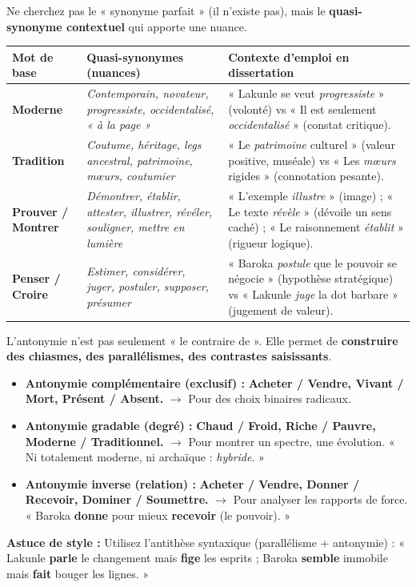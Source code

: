 \documentclass[11pt]{article}
\begin{document}
\begin{propriete}
Ne cherchez pas le « synonyme parfait » (il n'existe pas), mais le \textbf{quasi-synonyme contextuel} qui apporte une nuance.
\begin{center}
\begin{tabularx}{\linewidth}{|l|X|X|}
\hline
\rowcolor{popblueL}
\textbf{Mot de base} & \textbf{Quasi-synonymes (nuances)} & \textbf{Contexte d'emploi en dissertation} \\
\hline
\textbf{Moderne} & \emph{Contemporain, novateur, progressiste, occidentalisé, « à la page »} & « Lakunle se veut \emph{progressiste} » (volonté) vs « Il est seulement \emph{occidentalisé} » (constat critique). \\
\hline
\textbf{Tradition} & \emph{Coutume, héritage, legs ancestral, patrimoine, mœurs, coutumier} & « Le \emph{patrimoine} culturel » (valeur positive, muséale) vs « Les \emph{mœurs} rigides » (connotation pesante). \\
\hline
\textbf{Prouver / Montrer} & \emph{Démontrer, établir, attester, illustrer, révéler, souligner, mettre en lumière} & « L'exemple \emph{illustre} » (image) ; « Le texte \emph{révèle} » (dévoile un sens caché) ; « Le raisonnement \emph{établit} » (rigueur logique). \\
\hline
\textbf{Penser / Croire} & \emph{Estimer, considérer, juger, postuler, supposer, présumer} & « Baroka \emph{postule} que le pouvoir se négocie » (hypothèse stratégique) vs « Lakunle \emph{juge} la dot barbare » (jugement de valeur). \\
\hline
\end{tabularx}
\end{center}
\end{propriete}

\begin{propriete}
L'antonymie n'est pas seulement « le contraire de ». Elle permet de \textbf{construire des chiasmes, des parallélismes, des contrastes saisissants}.
\begin{itemize}
    \item \textbf{Antonymie complémentaire (exclusif) :} \textbf{Acheter / Vendre, Vivant / Mort, Présent / Absent.} $\rightarrow$ Pour des choix binaires radicaux.
    \item \textbf{Antonymie gradable (degré) :} \textbf{Chaud / Froid, Riche / Pauvre, Moderne / Traditionnel.} $\rightarrow$ Pour montrer un spectre, une évolution. « Ni totalement moderne, ni archaïque : \emph{hybride}. »
    \item \textbf{Antonymie inverse (relation) :} \textbf{Acheter / Vendre, Donner / Recevoir, Dominer / Soumettre.} $\rightarrow$ Pour analyser les rapports de force. « Baroka \textbf{donne} pour mieux \textbf{recevoir} (le pouvoir). »
\end{itemize}
\textbf{Astuce de style :} Utilisez l'antithèse syntaxique (parallélisme + antonymie) : « Lakunle \textbf{parle} le changement mais \textbf{fige} les esprits ; Baroka \textbf{semble} immobile mais \textbf{fait} bouger les lignes. »
\end{propriete}
\end{document}
